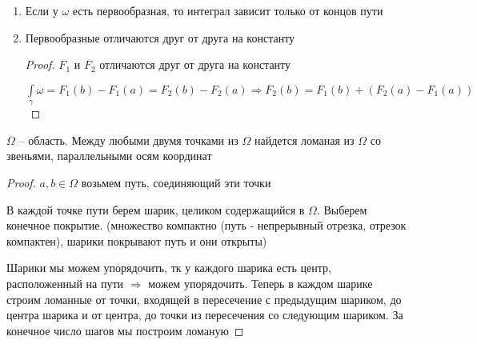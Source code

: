 \begin{consequence}\thmslashn

	\begin{enumerate}
		
		\item
		Если у $\omega$ есть первообразная, то интеграл зависит только от концов пути
		
		\item
		Первообразные отличаются друг от друга на константу
		
		\begin{proof}\thmslashn
			
			$F_1$ и $F_2$ отличаются друг от друга на константу
			
			$\int\limits_{\gamma} \omega = F_1(b) - F_1(a) = F_2(b) - F_2(a) \Rightarrow F_2(b) = F_1(b) + (F_2(a) - F_1(a))$
			
		\end{proof}
	
	\end{enumerate}

\end{consequence}

\begin{lemma}
	
	$\Omega$ -- область. Между любыми двумя точками из $\Omega$ найдется ломаная из $\Omega$ со звеньями, параллельными осям координат
	
\end{lemma}

\begin{proof}\thmslashn
	
	$a, b \in \Omega$ возьмем путь, соединяющий эти точки
	
    В каждой точке пути берем шарик, целиком содержащийся в $\Omega$. Выберем конечное покрытие. (множество компактно (путь - непрерывный отрезка, отрезок компактен), шарики покрывают путь и они открыты)
	
	Шарики мы можем упорядочить, тк у каждого шарика есть центр, расположенный на пути $\Rightarrow$ можем упорядочить. Теперь в каждом шарике строим ломанные от точки, входящей в пересечение с предыдущим шариком, до центра шарика и от центра, до точки из пересечения со следующим шариком. За конечное число шагов мы построим ломаную 
	
\end{proof}

